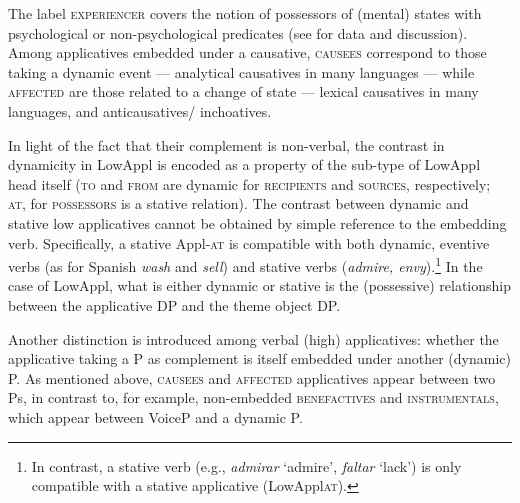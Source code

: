 \documentclass[output=paper,colorlinks,citecolor=brown,modfonts,nonflat]{langsci/langscibook}
\begin{document}
\begin{figure}
\renewcommand{\thefootnote}{\roman{footnote}}
\end{figure}

The label \textsc{experiencer} covers the notion of possessors of (mental) states with psychological or non-psychological predicates (see  for data and discussion). Among applicatives embedded under a causative, \textsc{causees} correspond to those taking a dynamic event — analytical causatives in many languages — while \textsc{affected} are those related to a change of state — lexical causatives in many languages, and anticausatives/ inchoatives.

In light of the fact that their complement is non-verbal, the contrast in dynamicity in LowAppl is encoded as a property of the sub-type of LowAppl head itself (\textsc{to} and \textsc{from} are dynamic for \textsc{recipients} and \textsc{sources}, respectively; \textsc{at}, for \textsc{possessors} is a stative relation). The contrast between dynamic and stative low applicatives cannot be obtained by simple reference to the embedding verb. Specifically, a stative Appl-\textsc{at} is compatible with both dynamic, eventive verbs (as for Spanish \textit{wash} and \textit{sell}) and stative verbs (\textit{admire, envy}).\footnote{In contrast, a stative verb (e.g., \textit{admirar} ‘admire’, \textit{faltar} ‘lack’) is only compatible with a stative applicative (LowAppl\textsc{at}).}  In the case of LowAppl, what is either dynamic or stative is the (possessive) relationship between the applicative DP and the theme object DP.

Another distinction is introduced among verbal (high) applicatives: whether the applicative taking a {\liv}P as complement is itself embedded under another (dynamic) {\liv}P. As mentioned above, \textsc{causees} and \textsc{affected} applicatives appear between two {\liv}Ps, in contrast to, for example, non-embedded \textsc{benefactives} and \textsc{instrumentals}, which appear between VoiceP and a dynamic {\liv}P.
\end{document}
